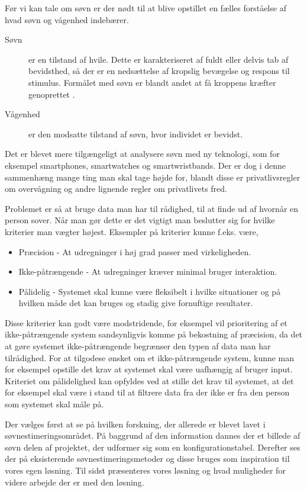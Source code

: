 Før vi kan tale om søvn er der nødt til at blive opstillet en fælles forståelse af hvad søvn og vågenhed indebærer.
\begin{description}
		\item[Søvn] er en tilstand af hvile. Dette er karakteriseret af fuldt eller delvis tab af bevidsthed, så der er en nedsættelse af kropslig bevægelse og respons til stimulus. Formålet med søvn er blandt andet at få kroppens kræfter genoprettet \citep{misc:SleepDefinition}.
		\item[Vågenhed] er den modsatte tilstand af søvn, hvor individet er bevidst.
\end{description}

Det er blevet mere tilgængeligt at analysere søvn med ny teknologi, som for eksempel smartphones, smartwatches og smartwristbands.
Der er dog i denne sammenhæng mange ting man skal tage højde for, blandt disse er privatlivsregler om overvågning og andre lignende regler om privatlivets fred.

Problemet er så at bruge data man har til rådighed, til at finde ud af hvornår en person sover.
Når man gør dette er det vigtigt man beslutter sig for hvilke kriterier man vægter højest.
Eksempler på kriterier kunne f.eks. være,

\begin{itemize}
	\item Præcision - At udregninger i høj grad passer med virkeligheden.
	\item Ikke-påtrængende - At udregninger kræver minimal bruger interaktion.
	\item Pålidelig - Systemet skal kunne være fleksibelt i hvilke situationer og på hvilken måde det kan bruges og stadig give fornuftige resultater.
\end{itemize}

Disse kriterier kan godt være modstridende, for eksempel vil prioritering af et ikke-påtrængende system sandsynligvis komme på bekostning af præcision, da det at gøre systemet ikke-påtrængende begrænser den typen af data man har tilrådighed.
For at tilgodese ønsket om et ikke-påtrængende system, kunne man for eksempel opstille det krav at systemet skal være uafhængig af bruger input.
Kriteriet om pålidelighed kan opfyldes ved at stille det krav til systemet, at det for eksempel skal være i stand til at filtrere data fra der ikke er fra den person som systemet skal måle på.

Der vælges først at se på hvilken forskning, der allerede er blevet lavet i søvn\-es\-ti\-me\-rings\-om\-rå\-det.
På baggrund af den information dannes der et billede af søvn delen af projektet, der udformer sig som en konfigurationstabel.
Derefter ses der på eksisterende søvnestimeringsmetoder og disse bruges som inspiration til vores egen løsning.
Til sidst præsenteres vores løsning og hvad muligheder for videre arbejde der er med den løsning. 
